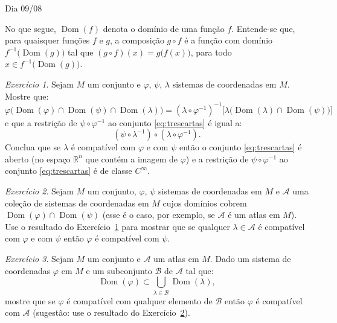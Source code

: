 \documentclass[oneside,11pt]{amsart}
\newcommand{\R}{\mathds R}
\DeclareMathOperator{\Dom}{Dom}
\theoremstyle{remark}\newtheorem{exercise}{Exercício}[section]
\theoremstyle{plain}\newtheorem{teo}{Teorema}[section]
\theoremstyle{plain}\newtheorem{lem}[teo]{Lema}
\theoremstyle{plain}\newtheorem{prop}[teo]{Proposição}
\theoremstyle{definition}\newtheorem{defin}[teo]{Definição}
\theoremstyle{remark}\newtheorem{rem}[teo]{Observação}
\theoremstyle{definition}\newtheorem{example}[teo]{Exemplo}
\numberwithin{equation}{section}
\begin{document}
\begin{section}{Dia 09/08}

No que segue, $\Dom(f)$ denota o domínio de uma função $f$. Entende-se que, para quaisquer funções $f$ e $g$, a composição $g\circ f$ é a função
com domínio $f^{-1}\big(\!\Dom(g)\big)$ tal que $(g\circ f)(x)=g\big(f(x)\big)$, para todo $x\in f^{-1}\big(\!\Dom(g)\big)$.

\begin{exercise}\label{exe:trescartas}
Sejam $M$ um conjunto e $\varphi$, $\psi$, $\lambda$ sistemas de coordenadas em $M$. Mostre que:
\begin{equation}\label{eq:trescartas}
\varphi\big(\!\Dom(\varphi)\cap\Dom(\psi)\cap\Dom(\lambda)\big)=(\lambda\circ\varphi^{-1})^{-1}\big[\lambda\big(\!\Dom(\lambda)\cap\Dom(\psi)\big)\big]
\end{equation}
e que a restrição de $\psi\circ\varphi^{-1}$ ao conjunto \eqref{eq:trescartas} é igual a:
\[(\psi\circ\lambda^{-1})\circ(\lambda\circ\varphi^{-1}).\]
Conclua que se $\lambda$ é compatível com $\varphi$ e com $\psi$ então o conjunto \eqref{eq:trescartas} é aberto (no espaço $\R^n$ que contém
a imagem de $\varphi$) e a restrição de $\psi\circ\varphi^{-1}$ ao conjunto \eqref{eq:trescartas} é de classe $C^\infty$.
\end{exercise}

\begin{exercise}\label{exe:lambdas}
Sejam $M$ um conjunto, $\varphi$, $\psi$ sistemas de coordenadas em $M$ e $\mathcal A$ uma coleção de sistemas de coordenadas em $M$ cujos domínios
cobrem $\Dom(\varphi)\cap\Dom(\psi)$ (esse é o caso, por exemplo, se $\mathcal A$ é um atlas em $M$). Use o resultado do Exercício~\ref{exe:trescartas}
para mostrar que se qualquer $\lambda\in\mathcal A$ é compatível com $\varphi$ e com $\psi$ então $\varphi$ é compatível com $\psi$.
\end{exercise}

\begin{exercise}\label{exe:lambdas2}
Sejam $M$ um conjunto e $\mathcal A$ um atlas em $M$. Dado um sistema de coordenadas $\varphi$ em $M$ e um subconjunto $\mathcal B$ de $\mathcal A$ tal que:
\[\Dom(\varphi)\subset\bigcup_{\lambda\in\mathcal B}\Dom(\lambda),\]
mostre que se $\varphi$ é compatível com qualquer elemento de $\mathcal B$ então $\varphi$ é compatível com $\mathcal A$ (sugestão:
use o resultado do Exercício~\ref{exe:lambdas}).
\end{exercise}


\end{section}
\end{document}
